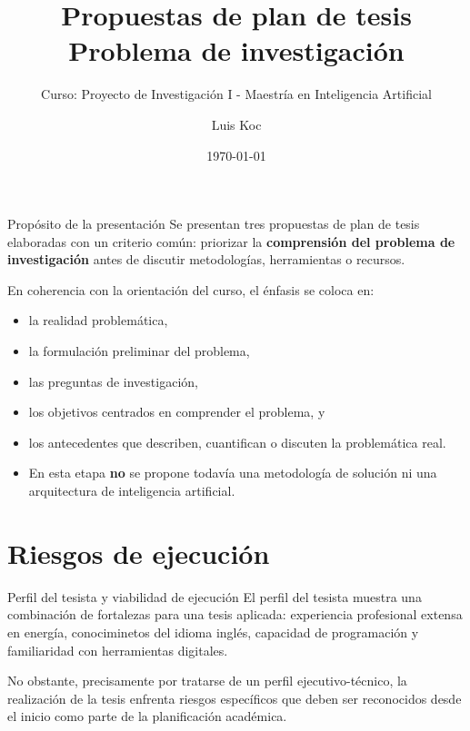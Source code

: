 \documentclass[aspectratio=169]{beamer}
\title{Propuestas de plan de tesis\\Problema de investigación}
\subtitle{Curso: Proyecto de Investigación I - Maestría en Inteligencia Artificial}
\author{Luis Koc}
\date{\today}
\begin{document}
\begin{frame}
  \titlepage
\end{frame}

\begin{frame}{Propósito de la presentación}
\justifying
Se presentan tres propuestas de plan de tesis elaboradas con un criterio común: priorizar la \textbf{comprensión del problema de investigación} antes de discutir metodologías, herramientas o recursos.

\vspace{0.5em}
En coherencia con la orientación del curso, el énfasis se coloca en:
\begin{itemize}[leftmargin=*]
    \item la realidad problemática,
    \item la formulación preliminar del problema,
    \item las preguntas de investigación,
    \item los objetivos centrados en comprender el problema, y
    \item los antecedentes que describen, cuantifican o discuten la problemática real.
    \item En esta etapa \textbf{no} se propone todavía una metodología de solución ni una arquitectura de inteligencia artificial.
\end{itemize}
\end{frame}

\section{Riesgos de ejecución}

\begin{frame}{Perfil del tesista y viabilidad de ejecución}
\justifying
El perfil del tesista muestra una combinación de fortalezas para una tesis aplicada: experiencia profesional extensa en energía, conociminetos del idioma inglés, capacidad de programación y familiaridad con herramientas digitales.

\vspace{0.5em}
No obstante, precisamente por tratarse de un perfil ejecutivo-técnico, la realización de la tesis enfrenta riesgos específicos que deben ser reconocidos desde el inicio como parte de la planificación académica.
\end{frame}
\end{document}
